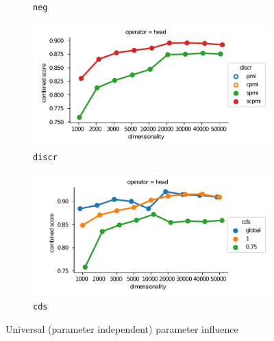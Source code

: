 \begin{figure}[b]
\begin{subfigure}[t]{0.49\textwidth}
  \caption{\texttt{neg}}
  \label{fig:single-neg}
  \end{subfigure}
  \begin{subfigure}[t]{0.49\textwidth}

  \includegraphics[width=\textwidth]{supplement/figures/single-interaction-discr}

  \caption{\texttt{discr}}
  \label{fig:single-discr}
  \end{subfigure}

  \begin{subfigure}[t]{0.49\textwidth}

  \includegraphics[width=\textwidth]{supplement/figures/single-interaction-cds}

  \caption{\texttt{cds}}
  \label{fig:single-cds}
  \end{subfigure}

  \caption{Universal (parameter independent) parameter influence}
  \label{fig:single-params}
\end{figure}
